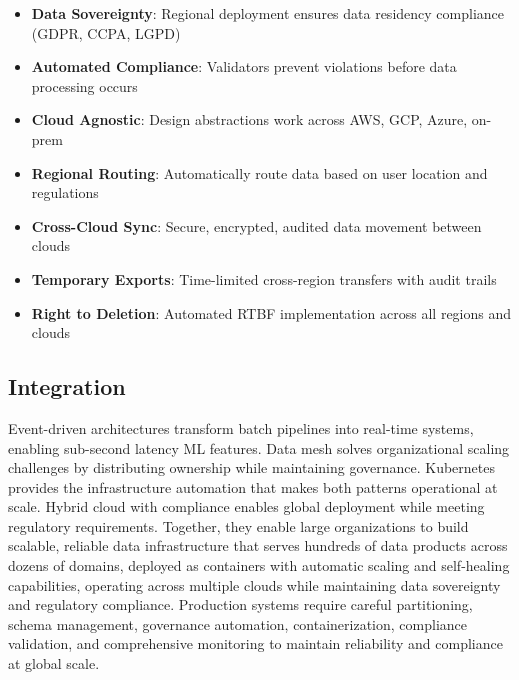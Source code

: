 \begin{itemize}
    \item \textbf{Data Sovereignty}: Regional deployment ensures data residency compliance (GDPR, CCPA, LGPD)
    \item \textbf{Automated Compliance}: Validators prevent violations before data processing occurs
    \item \textbf{Cloud Agnostic}: Design abstractions work across AWS, GCP, Azure, on-prem
    \item \textbf{Regional Routing}: Automatically route data based on user location and regulations
    \item \textbf{Cross-Cloud Sync}: Secure, encrypted, audited data movement between clouds
    \item \textbf{Temporary Exports}: Time-limited cross-region transfers with audit trails
    \item \textbf{Right to Deletion}: Automated RTBF implementation across all regions and clouds
\end{itemize}

\subsection{Integration}

Event-driven architectures transform batch pipelines into real-time systems, enabling sub-second latency ML features. Data mesh solves organizational scaling challenges by distributing ownership while maintaining governance. Kubernetes provides the infrastructure automation that makes both patterns operational at scale. Hybrid cloud with compliance enables global deployment while meeting regulatory requirements. Together, they enable large organizations to build scalable, reliable data infrastructure that serves hundreds of data products across dozens of domains, deployed as containers with automatic scaling and self-healing capabilities, operating across multiple clouds while maintaining data sovereignty and regulatory compliance. Production systems require careful partitioning, schema management, governance automation, containerization, compliance validation, and comprehensive monitoring to maintain reliability and compliance at global scale.
